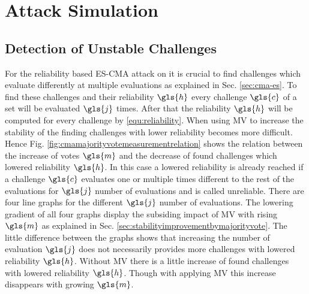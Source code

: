 \chapter{Attack Simulation}
\label{cap:attacksimulations}


\section{Detection of Unstable Challenges}

For the reliability based \ac{ES-CMA} attack on \apufs it is crucial to find challenges which evaluate differently at multiple evaluations as explained in Sec. \ref{sec:cma-es}.
To find these challenges and their reliability $\gls{h}$ every challenge $\gls{c}$ of a set will be evaluated $\gls{j}$ times.
After that the reliability $\gls{h}$ will be computed for every challenge by \ref{equ:reliability}.
When using \ac{MV} to increase the stability of the \apuf finding challenges with lower reliability becomes more difficult.
Hence Fig. \ref{fig:cmamajorityvotemeasurementrelation} shows the relation between the increase of votes $\gls{m}$ and the decrease of found challenges which lowered reliability $\gls{h}$.
In this case a lowered reliability is already reached if a challenge $\gls{c}$ evaluates one or multiple times different to the rest of the evaluations for $\gls{j}$ number of evaluations and is called unreliable.
There are four line graphs for the different $\gls{j}$ number of evaluations.
The lowering gradient of all four graphs display the subsiding impact of \ac{MV} with rising $\gls{m}$ as explained in Sec. \ref{sec:stabilityimprovementbymajorityvote}.
The little difference between the graphs shows that increasing the number of evaluation $\gls{j}$ does not necessarily provides more challenges with lowered reliability $\gls{h}$.
Without \ac{MV} there is a little increase of found challenges with lowered reliability $\gls{h}$.
Though with applying \ac{MV} this increase disappears with growing $\gls{m}$.

